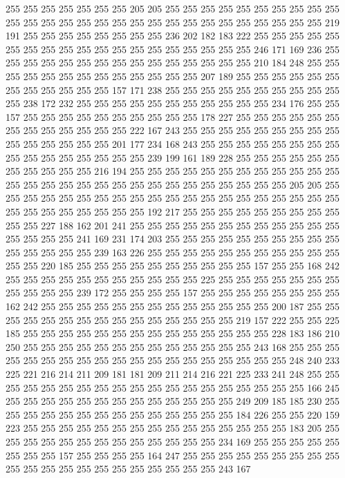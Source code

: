 255 255 255 255 255 255 255 205 205 255 255 255 255 255 255 255 255 255 255 255
255 255 255 255 255 255 255 255 255 255 255 255 255 255 255 255 255 219 191 255
255 255 255 255 255 255 255 236 202 182 183 222 255 255 255 255 255 255 255 255
255 255 255 255 255 255 255 255 255 255 255 246 171 169 236 255 255 255 255 255
255 255 255 255 255 255 255 255 255 255 210 184 248 255 255 255 255 255 255 255
255 255 255 255 255 255 207 189 255 255 255 255 255 255 255 255 255 255 255 255
157 171 238 255 255 255 255 255 255 255 255 255 255 255 238 172 232 255 255 255
255 255 255 255 255 255 255 255 234 176 255 255 157 255 255 255 255 255 255 255
255 255 255 178 227 255 255 255 255 255 255 255 255 255 255 255 255 255 222 167
243 255 255 255 255 255 255 255 255 255 255 255 255 255 255 255 201 177 234 168
243 255 255 255 255 255 255 255 255 255 255 255 255 255 255 255 255 239 199 161
189 228 255 255 255 255 255 255 255 255 255 255 255 216 194 255 255 255 255 255
255 255 255 255 255 255 255 255 255 255 255 255 255 255 255 255 255 255 255 255
255 255 255 205 205 255 255 255 255 255 255 255 255 255 255 255 255 255 255 255
255 255 255 255 255 255 255 255 255 255 255 255 255 192 217 255 255 255 255 255
255 255 255 255 255 255 227 188 162 201 241 255 255 255 255 255 255 255 255 255
255 255 255 255 255 255 255 241 169 231 174 203 255 255 255 255 255 255 255 255
255 255 255 255 255 255 255 239 163 226 255 255 255 255 255 255 255 255 255 255
255 255 255 220 185 255 255 255 255 255 255 255 255 255 255 157 255 255 168 242
255 255 255 255 255 255 255 255 255 255 255 225 255 255 255 255 255 255 255 255
255 255 255 239 172 255 255 255 255 157 255 255 255 255 255 255 255 255 162 242
255 255 255 255 255 255 255 255 255 255 255 255 255 200 187 255 255 255 255 255
255 255 255 255 255 255 255 255 255 255 219 157 222 255 255 225 185 255 255 255
255 255 255 255 255 255 255 255 255 255 255 228 183 186 210 250 255 255 255 255
255 255 255 255 255 255 255 255 255 243 168 255 255 255 255 255 255 255 255 255
255 255 255 255 255 255 255 255 255 255 248 240 233 225 221 216 214 211 209 181
181 209 211 214 216 221 225 233 241 248 255 255 255 255 255 255 255 255 255 255
255 255 255 255 255 255 255 255 255 166 245 255 255 255 255 255 255 255 255 255
255 255 255 255 249 209 185 185 230 255 255 255 255 255 255 255 255 255 255 255
255 255 255 184 226 255 255 220 159 223 255 255 255 255 255 255 255 255 255 255
255 255 255 255 255 183 205 255 255 255 255 255 255 255 255 255 255 255 255 255
234 169 255 255 255 255 255 255 255 255 157 255 255 255 255 164 247 255 255 255
255 255 255 255 255 255 255 255 255 255 255 255 255 255 255 255 255 255 243 167
